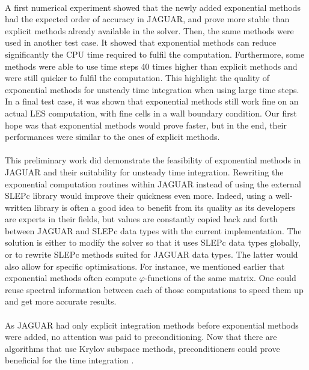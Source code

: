     \paragraph{}
    A first numerical experiment showed that the newly added exponential methods had the expected order of accuracy in JAGUAR, and prove more stable than explicit methods already available in the solver.
    Then, the same methods were used in another test case.
    It showed that exponential methods can reduce significantly the CPU time required to fulfil the computation.
    Furthermore, some methods were able to use time steps 40 times higher than explicit methods and were still quicker to fulfil the computation.
    This highlight the quality of exponential methods for unsteady time integration when using large time steps.
    In a final test case, it was shown that exponential methods still work fine on an actual LES computation, with fine cells in a wall boundary condition.
    Our first hope was that exponential methods would prove faster, but in the end, their performances were similar to the ones of explicit methods.

    \paragraph{}
    This preliminary work did demonstrate the feasibility of exponential methods in JAGUAR and their suitability for unsteady time integration.
    Rewriting the exponential computation routines within JAGUAR instead of using the external SLEPc library would improve their quickness even more.
    Indeed, using a well-written library is often a good idea to benefit from its quality as its developers are experts in their fields, but values are constantly copied back and forth between JAGUAR and SLEPc data types with the current implementation.
    The solution is either to modify the solver so that it uses SLEPc data types globally, or to rewrite SLEPc methods suited for JAGUAR data types.
    The latter would also allow for specific optimisations.
    For instance, we mentioned earlier that exponential methods often compute $\varphi$-functions of the same matrix.
    One could reuse spectral information between each of those computations to speed them up and get more accurate results.

    \paragraph{}
    As JAGUAR had only explicit integration methods before exponential methods were added, no attention was paid to preconditioning.
    Now that there are algorithms that use Krylov subspace methods, preconditioners could prove beneficial for the time integration \cite{CastilloSaad1997}.

